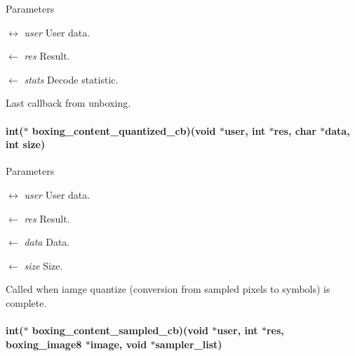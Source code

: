 \begin{DoxyParams}{Parameters}
\item[\mbox{$\leftrightarrow$} {\em user}]User data. \item[\mbox{$\leftarrow$} {\em res}]Result. \item[\mbox{$\leftarrow$} {\em stats}]Decode statistic.\end{DoxyParams}
Last callback from unboxing. \hypertarget{group__unboxer_ga200ab55a4d8302d501a8964ec5941e10}{
\paragraph[{boxing\_\-content\_\-quantized\_\-cb}]{\setlength{\rightskip}{0pt plus 5cm}int($\ast$ {\bf boxing\_\-content\_\-quantized\_\-cb})(void $\ast$user, int $\ast$res, char $\ast$data, int size)}\hfill}
\label{group__unboxer_ga200ab55a4d8302d501a8964ec5941e10}

\begin{DoxyParams}{Parameters}
\item[\mbox{$\leftrightarrow$} {\em user}]User data. \item[\mbox{$\leftarrow$} {\em res}]Result. \item[\mbox{$\leftarrow$} {\em data}]Data. \item[\mbox{$\leftarrow$} {\em size}]Size.\end{DoxyParams}
Called when iamge quantize (conversion from sampled pixels to symbols) is complete. \hypertarget{group__unboxer_gade5396bcb001d9594974e76edcd22343}{
\paragraph[{boxing\_\-content\_\-sampled\_\-cb}]{\setlength{\rightskip}{0pt plus 5cm}int($\ast$ {\bf boxing\_\-content\_\-sampled\_\-cb})(void $\ast$user, int $\ast$res, boxing\_\-image8 $\ast$image, void $\ast$sampler\_\-list)}\hfill}
\label{group__unboxer_gade5396bcb001d9594974e76edcd22343}

